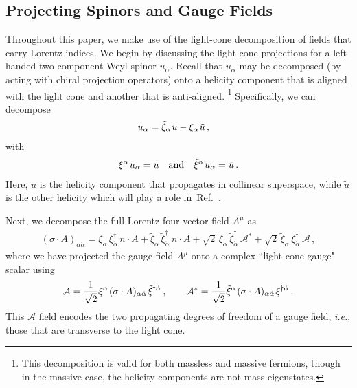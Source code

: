 \documentclass[12pt,document,nofootinbib,superscriptaddress,onecolumn,preprintnumbers,balancelastpage]{article}
\newcommand{\s}{\hspace{0.8pt}}
\DeclareRobustCommand{\Ref}[1]{Ref.~\cite{#1}}
\newcommand{\alc}{\mathcal{A}}
\newcommand{\uu}{\tilde u}
\begin{document}
\begin{spacing}{1.2}
\subsection{Projecting Spinors and Gauge Fields}
\label{sec:ProjectGauge}

Throughout this paper, we make use of the light-cone decomposition of fields that carry Lorentz indices.
%
We begin by discussing the light-cone projections for a left-handed two-component Weyl spinor $u_\alpha$.
%
Recall that $u_\alpha$ may be decomposed (by acting with chiral projection operators) onto a helicity component that is aligned with the light cone and another that is anti-aligned.%
%
\footnote{This decomposition is valid for both massless and massive fermions, though in the massive case, the helicity components are not mass eigenstates.}
%
Specifically, we can decompose
\vspace{-3mm}
\begin{align}
\label{eq:udecom}
&u_\alpha =  \tilde{\xi}_\alpha\s u - \xi_\alpha\s \tilde{u}\,, 
\end{align}
with
\vspace{-3mm}
\begin{align}
\label{eq:udecom_reverse}
 \xi^\alpha \s u_\alpha = u \quad \text{and} \quad \tilde{\xi}^\alpha\s  u_\alpha = \tilde{u}\,.
\end{align}
%
Here, $u$ is the helicity component that propagates in collinear superspace, while $\uu$ is the other helicity which will play a role in~\Ref{Cohen:2019gsc}.
%

Next, we decompose the full Lorentz four-vector field $A^\mu$ as
%
\begin{align}
\left(\sigma \cdot A \right)_{\alpha \dot{\alpha}} = \xi_\alpha\, \xi^{\dagger}_{\dot{\alpha}}\, n\cdot A + \tilde{\xi}_\alpha\, \tilde{\xi}^\dagger_{\dot{\alpha}}\, \bar{n}\cdot A+\sqrt{2} \,  \xi_\alpha\, \tilde{\xi}^\dagger_{\dot{\alpha}}\, \alc^* +\sqrt{2} \,  \tilde{\xi}_\alpha\, \xi^{\dagger}_{\dot{\alpha}}\, \alc\,,
\end{align}
%
where we have projected the gauge field $A^\mu$ onto a complex ``light-cone gauge" scalar using
%
\begin{align}
\label{eq:def_script_A}
\alc =\frac{1}{\sqrt{2}} \xi^\alpha\s (\sigma \cdot A )_{\alpha \dot{\alpha}}\s \tilde{\xi}^{\dagger \dot{\alpha}} \, , \quad \quad \alc^* =  \frac{1}{\sqrt{2}} \tilde \xi^\alpha\s (\sigma \cdot A )_{\alpha \dot{\alpha}}\s \xi^{\dagger \dot{\alpha}} \,.
\end{align}
This $\alc$ field encodes the two propagating degrees of freedom of a gauge field, \emph{i.e.}, those that are transverse to the light cone. 


\end{spacing}
\end{document}
